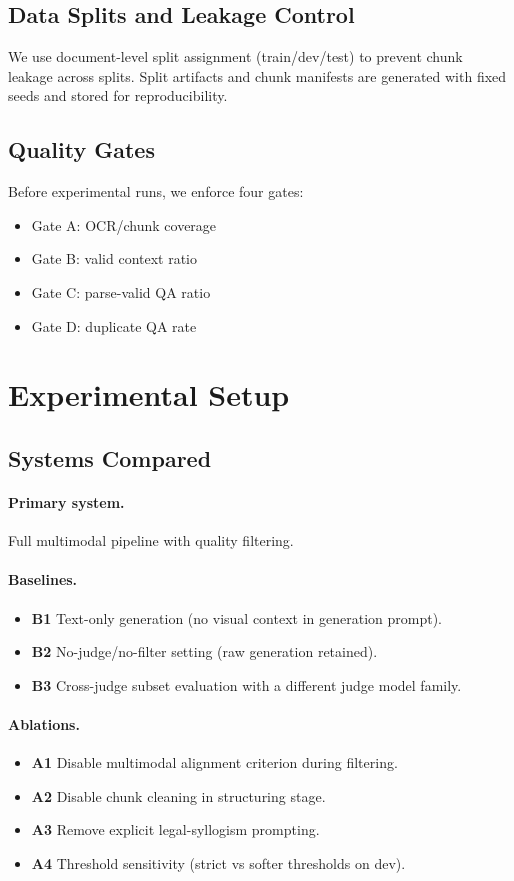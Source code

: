 \subsection{Data Splits and Leakage Control}
We use document-level split assignment (train/dev/test) to prevent chunk leakage across splits. Split artifacts and chunk manifests are generated with fixed seeds and stored for reproducibility.

\subsection{Quality Gates}
Before experimental runs, we enforce four gates:
\begin{itemize}
\item Gate A: OCR/chunk coverage
\item Gate B: valid context ratio
\item Gate C: parse-valid QA ratio
\item Gate D: duplicate QA rate
\end{itemize}

\section{Experimental Setup}
\label{sec:setup}
\subsection{Systems Compared}
\paragraph{Primary system.}
Full multimodal pipeline with quality filtering.

\paragraph{Baselines.}
\begin{itemize}
\item \textbf{B1} Text-only generation (no visual context in generation prompt).
\item \textbf{B2} No-judge/no-filter setting (raw generation retained).
\item \textbf{B3} Cross-judge subset evaluation with a different judge model family.
\end{itemize}

\paragraph{Ablations.}
\begin{itemize}
\item \textbf{A1} Disable multimodal alignment criterion during filtering.
\item \textbf{A2} Disable chunk cleaning in structuring stage.
\item \textbf{A3} Remove explicit legal-syllogism prompting.
\item \textbf{A4} Threshold sensitivity (strict vs softer thresholds on dev).
\end{itemize}

